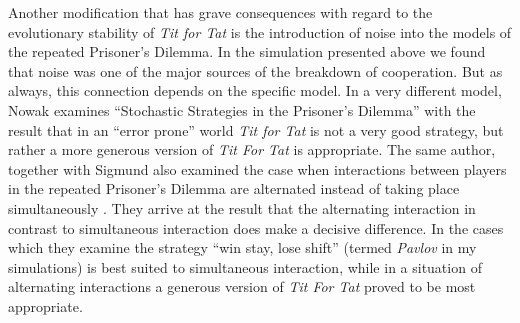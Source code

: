Another modification that has grave consequences with regard to the
evolutionary stability of {\em Tit for Tat} is the introduction of noise into
the models of the repeated Prisoner's Dilemma. In the simulation presented
above we found that noise was one of the major sources of the breakdown of
cooperation. But as always, this connection depends on the specific model. In
a very different model, Nowak examines ``Stochastic Strategies in the
Prisoner's Dilemma'' \cite[]{nowak:1990} with the result that in an ``error
prone'' world {\em Tit for Tat} is not a very good strategy, but rather a more
generous version of {\em Tit For Tat} is appropriate. The same author,
together with Sigmund also examined the case when interactions between players
in the repeated Prisoner's Dilemma are alternated instead of taking place
simultaneously \cite[]{nowak-sigmund:1994}. They arrive at the result that the
alternating interaction in contrast to simultaneous interaction does make a
decisive difference. In the cases which they examine the strategy ``win stay,
lose shift'' (termed {\em Pavlov} in my simulations) is best suited to
simultaneous interaction, while in a situation of alternating interactions a
generous version of {\em Tit For Tat} proved to be most appropriate.

